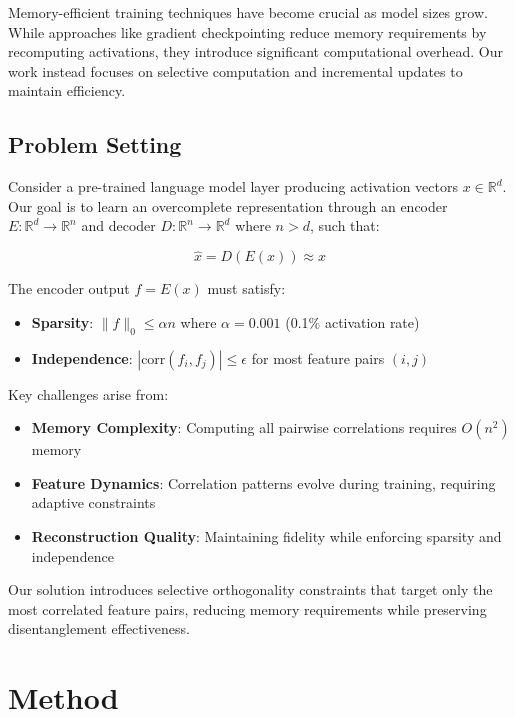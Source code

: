 \documentclass{article} %
\begin{document}
Memory-efficient training techniques have become crucial as model sizes grow. While approaches like gradient checkpointing \cite{goodfellow2016deep} reduce memory requirements by recomputing activations, they introduce significant computational overhead. Our work instead focuses on selective computation and incremental updates to maintain efficiency.

\subsection{Problem Setting}
\label{subsec:problem}

Consider a pre-trained language model layer producing activation vectors $x \in \mathbb{R}^d$. Our goal is to learn an overcomplete representation through an encoder $E: \mathbb{R}^d \rightarrow \mathbb{R}^n$ and decoder $D: \mathbb{R}^n \rightarrow \mathbb{R}^d$ where $n > d$, such that:

\begin{equation}
    \hat{x} = D(E(x)) \approx x
\end{equation}

The encoder output $f = E(x)$ must satisfy:
\begin{itemize}
    \item \textbf{Sparsity}: $\|f\|_0 \leq \alpha n$ where $\alpha = 0.001$ (0.1\% activation rate)
    \item \textbf{Independence}: $|\text{corr}(f_i, f_j)| \leq \epsilon$ for most feature pairs $(i,j)$
\end{itemize}

Key challenges arise from:
\begin{itemize}
    \item \textbf{Memory Complexity}: Computing all pairwise correlations requires $O(n^2)$ memory
    \item \textbf{Feature Dynamics}: Correlation patterns evolve during training, requiring adaptive constraints
    \item \textbf{Reconstruction Quality}: Maintaining fidelity while enforcing sparsity and independence
\end{itemize}

Our solution introduces selective orthogonality constraints that target only the most correlated feature pairs, reducing memory requirements while preserving disentanglement effectiveness.

\section{Method}
\label{sec:method}
\end{document}
